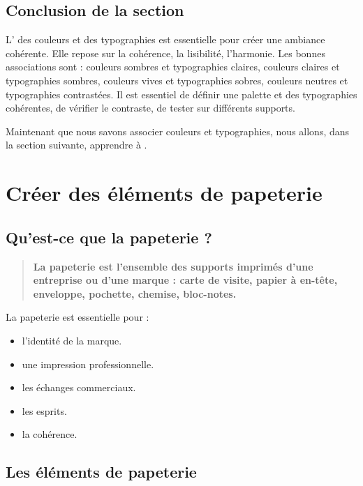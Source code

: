 \subsection*{Conclusion de la section}

L' des couleurs et des typographies est essentielle pour créer une ambiance cohérente. Elle repose sur la cohérence, la lisibilité, l'harmonie. Les bonnes associations sont : couleurs sombres et typographies claires, couleurs claires et typographies sombres, couleurs vives et typographies sobres, couleurs neutres et typographies contrastées. Il est essentiel de définir une palette et des typographies cohérentes, de vérifier le contraste, de tester sur différents supports.

Maintenant que nous savons associer couleurs et typographies, nous allons, dans la section suivante, apprendre à .

\section{Créer des éléments de papeterie}

\subsection{Qu'est-ce que la papeterie ?}

\begin{quote}
\textbf{La papeterie est l'ensemble des supports imprimés d'une entreprise ou d'une marque : carte de visite, papier à en-tête, enveloppe, pochette, chemise, bloc-notes.}
\end{quote}

La papeterie est essentielle pour :

\begin{itemize}
    \item {} l'identité de la marque.
    \item {} une impression professionnelle.
    \item {} les échanges commerciaux.
    \item {} les esprits.
    \item {} la cohérence.
\end{itemize}

\subsection{Les éléments de papeterie}

